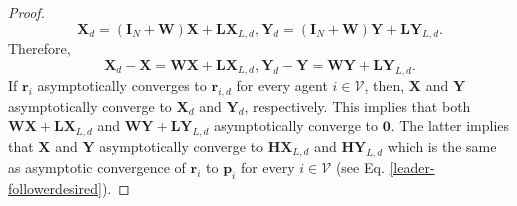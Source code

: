 \documentclass[journal]{IEEEtran}
\theoremstyle{definition}
\theoremstyle{plain}
\begin{document}
\begin{proof}
\begin{subequations}
    \begin{equation}
        \mathbf{X}_d=\left(\mathbf{I}_N+\mathbf{W}\right)\mathbf{X}+\mathbf{L}\mathbf{X}_{L,d},
    \end{equation}
      \begin{equation}
        \mathbf{Y}_d=\left(\mathbf{I}_N+\mathbf{W}\right)\mathbf{Y}+\mathbf{L}\mathbf{Y}_{L,d}.
    \end{equation}
\end{subequations}
Therefore, 
\begin{subequations}
    \begin{equation}
        \mathbf{X}_d-\mathbf{X}=\mathbf{W}\mathbf{X}+\mathbf{L}\mathbf{X}_{L,d},
    \end{equation}
      \begin{equation}
        \mathbf{Y}_d-\mathbf{Y}=\mathbf{W}\mathbf{Y}+\mathbf{L}\mathbf{Y}_{L,d}.
    \end{equation}
\end{subequations}
If $\mathbf{r}_i$ asymptotically converges to $\mathbf{r}_{i,d}$
 for every agent $i\in \mathcal{V}$, then, $\mathbf{X}$ and $\mathbf{Y}$ asymptotically converge to $\mathbf{X}_d$ and $\mathbf{Y}_d$, respectively. This implies that both $\mathbf{W}\mathbf{X}+\mathbf{L}\mathbf{X}_{L,d}$ and $\mathbf{W}\mathbf{Y}+\mathbf{L}\mathbf{Y}_{L,d}$ asymptotically converge to $\mathbf{0}$. The latter implies that $\mathbf{X}$ and $\mathbf{Y}$ asymptotically converge to $\mathbf{H}\mathbf{X}_{L,d}$ and $\mathbf{H}\mathbf{Y}_{L,d}$ which is the same as asymptotic convergence of $\mathbf{r}_i$ to $\mathbf{p}_i$ for every $i\in \mathcal{V}$ (see Eq. \eqref{leader-followerdesired}).
 
    
\end{proof}
\end{document}
